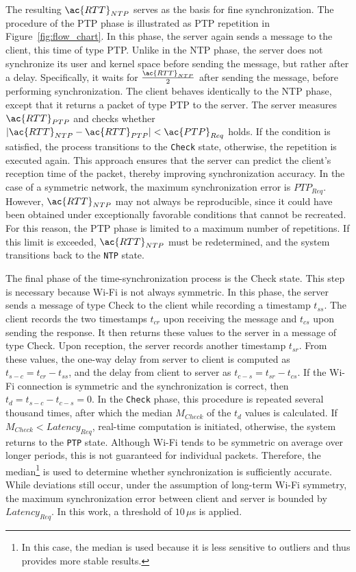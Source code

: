 The resulting $\ac{RTT}_{NTP}$ serves as the basis for fine synchronization.  
The procedure of the \ac{PTP} phase is illustrated as \ac{PTP} repetition in Figure~\ref{fig:flow_chart}.  
In this phase, the server again sends a message to the client, this time of type \ac{PTP}.  
Unlike in the \ac{NTP} phase, the server does not synchronize its user and kernel space before sending the message, but rather after a delay.  
Specifically, it waits for $\frac{\ac{RTT}_{NTP}}{2}$ after sending the message, before performing synchronization.  
The client behaves identically to the \ac{NTP} phase, except that it returns a packet of type \ac{PTP} to the server.  
The server measures $\ac{RTT}_{PTP}$ and checks whether $|\ac{RTT}_{NTP} - \ac{RTT}_{PTP}| < \ac{PTP}_{Req}$ holds.  
If the condition is satisfied, the process transitions to the \texttt{Check} state, otherwise, the repetition is executed again.  
This approach ensures that the server can predict the client's reception time of the packet, thereby improving synchronization accuracy.  
In the case of a symmetric network, the maximum synchronization error is $PTP_{Req}$.  
However, $\ac{RTT}_{NTP}$ may not always be reproducible, since it could have been obtained under exceptionally favorable conditions that cannot be recreated.  
For this reason, the \ac{PTP} phase is limited to a maximum number of repetitions.  
If this limit is exceeded, $\ac{RTT}_{NTP}$ must be redetermined, and the system transitions back to the \texttt{\ac{NTP}} state.  

The final phase of the time-synchronization process is the Check state.  
This step is necessary because Wi-Fi is not always symmetric.  
In this phase, the server sends a message of type Check to the client while recording a timestamp $t_{ss}$.  
The client records the two timestamps $t_{cr}$ upon receiving the message and $t_{cs}$ upon sending the response.  
It then returns these values to the server in a message of type Check.  
Upon reception, the server records another timestamp $t_{sr}$.  
From these values, the one-way delay from server to client is computed as $t_{s-c} = t_{cr} - t_{ss}$, and the delay from client to server as $t_{c-s} = t_{sr} - t_{cs}$.  
If the Wi-Fi connection is symmetric and the synchronization is correct, then $t_d = t_{s-c} - t_{c-s} = 0$.  
In the \texttt{Check} phase, this procedure is repeated several thousand times, after which the median $M_{Check}$ of the $t_d$ values is calculated.  
If $M_{Check} < Latency_{Req}$, real-time computation is initiated, otherwise, the system returns to the \texttt{\ac{PTP}} state.  
Although Wi-Fi tends to be symmetric on average over longer periods, this is not guaranteed for individual packets.  
Therefore, the median\footnote{In this case, the median is used because it is less sensitive to outliers and thus provides more stable results.} is used to determine whether synchronization is sufficiently accurate.  
While deviations still occur, under the assumption of long-term Wi-Fi symmetry, the maximum synchronization error between client and server is bounded by $Latency_{Req}$.  
In this work, a threshold of $10\,\mu$s is applied.  

